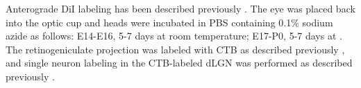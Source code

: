 Anterograde DiI labeling has been described previously \cite{plump2002slit1}.
The eye was placed back into the optic cup and heads were incubated in PBS containing 0.1\% sodium azide as follows: E14-E16, 5-7 days at
room temperature; E17-P0, 5-7 days at .
The retinogeniculate projection was labeled with CTB as described previously \cite{jaubert2005structural,rebsam2009switching}, and single neuron labeling in the CTB-labeled dLGN was performed as described previously \cite{krahe2011morphologically}.